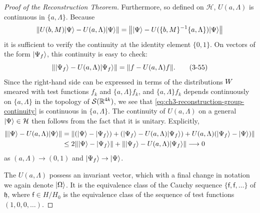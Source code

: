 \begin{proof}[Proof of the Reconstruction Theorem]
Furthermore, so defined on \(\mathcal H\), \(U(a,\Lambda)\) is continuous in
\(\{a,\Lambda\}\).  Because
\begin{equation*}
\left\lVert U(b,M)\lvert \Psi\rangle-U(a,\Lambda)\lvert \Psi\rangle\right\rVert
 =\left\lVert\lvert \Psi\rangle-U(\{b,M\}^{-1}\{a,\Lambda\})\lvert \Psi\rangle\right\rVert
\end{equation*}
it is sufficient to verify the continuity at the identity element \(\{0,1\}\).
On vectors of the form \(\lvert \Psi_f\rangle\), this continuity is easy to check:
\begin{equation}
\left\lVert\lvert \Psi_f\rangle-U(a,\Lambda)\lvert \Psi_f\rangle\right\rVert
 =\lVert f-U(a,\Lambda)f\rVert .
\tag{3-55}\label{eq:ch3-reconstruction-group-continuity}
\end{equation}
Since the right-hand side can be expressed in terms of the distributions
\(W\) smeared with test functions \(f_k\) and
\(\{a,\Lambda\}f_k\), and \(\{a,\Lambda\}f_k\) depends continuously on
\(\{a,\Lambda\}\) in the topology of \(\mathcal{S}(\mathbb{R}^{4k})\), we see that
\eqref{eq:ch3-reconstruction-group-continuity} is continuous in \(\{a,\Lambda\}\).  The continuity of
\(U(a,\Lambda)\) on a general \(\lvert \Psi\rangle\in\mathcal H\) then follows from
the fact that it is unitary.  Explicitly,
\begin{equation*}
\begin{aligned}
\left\lVert\lvert \Psi\rangle-U(a,\Lambda)\lvert \Psi\rangle\right\rVert
 &=\left\lVert(\lvert \Psi\rangle-\lvert \Psi_f\rangle)
 +(\lvert \Psi_f\rangle-U(a,\Lambda)\lvert \Psi_f\rangle)
 +U(a,\Lambda)(\lvert \Psi_f\rangle-\lvert \Psi\rangle)\right\rVert\\
 &\leq 2\lVert\lvert \Psi\rangle-\lvert \Psi_f\rangle\rVert
 +\left\lVert\lvert \Psi_f\rangle-U(a,\Lambda)\lvert \Psi_f\rangle\right\rVert\longrightarrow 0
\end{aligned}
\end{equation*}
as \((a,\Lambda)\to(0,1)\) and \(\lvert \Psi_f\rangle\to\lvert \Psi\rangle\).

The \(U(a,\Lambda)\) possess an invariant vector, which with a final change in
notation we again denote \(\lvert \Omega\rangle\).  It is the equivalence class of the
Cauchy sequence \(\{\mathsf f,\mathsf f,\ldots\}\) of \(\mathfrak h\), where
\(\mathsf f\in H/H_0\) is the equivalence class of the sequence of test
functions \((1,0,0,\ldots)\).


\end{proof}
